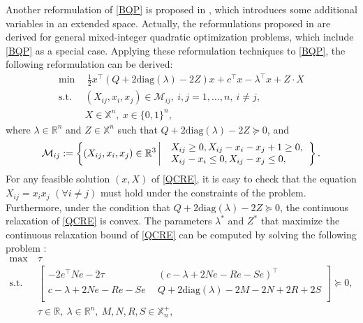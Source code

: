 \documentclass[pdflatex,sn-mathphys-num]{sn-jnl}%
\theoremstyle{thmstyleone}%
\theoremstyle{thmstyletwo}%
\theoremstyle{thmstylethree}%
\begin{document}
Another reformulation of \eqref{BQP} is proposed in \cite{Billionnet2012,Billionnet2013}, which introduces some additional variables in an extended space. Actually, the reformulations proposed in \cite{Billionnet2012,Billionnet2013} are derived for general mixed-integer quadratic optimization problems, which include \eqref{BQP} as a special case. Applying these reformulation techniques to \eqref{BQP}, the following reformulation can be derived:
\begin{equation}\label{QCRE}\tag{QCRE}
	\begin{aligned}
		\min ~&~ \frac{1}{2} x^\top (Q+2\textrm{diag}(\lambda)-2Z) x+c^\top x - \lambda^\top x + Z \cdot X \\
		\mbox{s.t.} ~~&(X_{ij},x_i,x_j)\in \mathcal{M}_{ij},~i,j=1,\ldots,n,~i\neq j,\\
		&X\in \mathbb{X}^n,~x\in\{0,1\}^n,
	\end{aligned}
\end{equation}
where $\lambda\in\mathbb{R}^n$ and $Z\in\mathbb{X}^n$ such that $Q+2\textrm{diag}(\lambda)-2Z\succeq 0$, and
\begin{equation}\label{eqn:McCormick}
	\begin{aligned}
		\mathcal{M}_{ij}:=\left\{ (X_{ij},x_i,x_j)\in\mathbb{R}^3 \left|\begin{array}{@{}llll}
			&X_{ij}\geq 0,X_{ij}-x_i-x_j+1\geq 0,\\
			&X_{ij}-x_i\leq 0,X_{ij}-x_j\leq 0,
		\end{array}\right.\right\}.
	\end{aligned}
\end{equation}
For any feasible solution $(x,X)$ of \eqref{QCRE}, it is easy to check that the equation $X_{ij}=x_i x_j$ $(\forall i\neq j)$ must hold under the constraints of the problem. %
Furthermore, under the condition that $Q+2\textrm{diag}(\lambda)-2Z\succeq 0$, the continuous relaxation of \eqref{QCRE} is convex. The parameters $\lambda^\ast$ and $Z^\ast$ that maximize the continuous relaxation bound of \eqref{QCRE} can be computed by solving the following problem \cite{Billionnet2012,Billionnet2013}:
\begin{equation}\label{SDPRLTDual}
	\begin{aligned}
		\max ~& \tau\\
		\mbox{s.t.} ~& \begin{bmatrix}
			-2 e^\top N e -2 \tau ~&~ (c -\lambda+2Ne -Re-Se)^\top \\
			c -\lambda+2Ne -Re-Se  ~&~ Q+2\textrm{diag}(\lambda)-2M-2N+2R+2S  \\
		\end{bmatrix}\succeq 0,\\
		~&\tau\in\mathbb{R},~ \lambda\in\mathbb{R}^n, ~ M,N,R,S\in\mathbb{X}^+_n,
	\end{aligned}
\end{equation}
\end{document}
